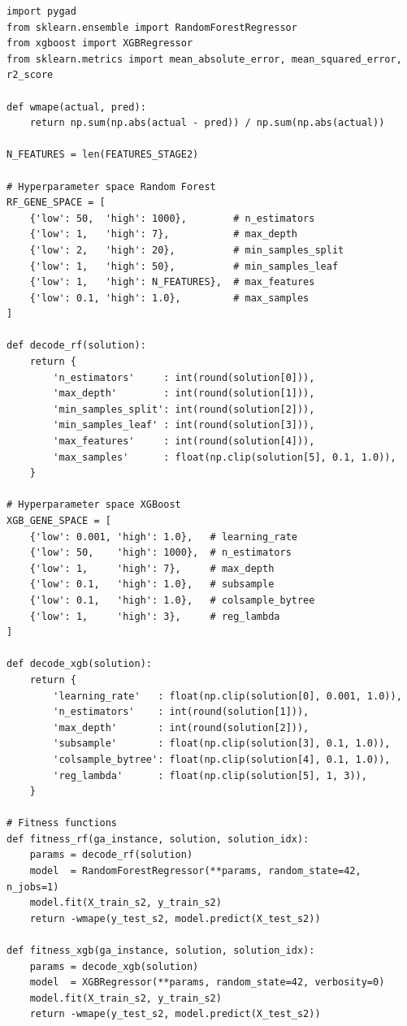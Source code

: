 \begin{lstlisting}[style=pycode,caption={Definisi hyperparameter space dan fungsi fitness GA}]
import pygad
from sklearn.ensemble import RandomForestRegressor
from xgboost import XGBRegressor
from sklearn.metrics import mean_absolute_error, mean_squared_error, r2_score

def wmape(actual, pred):
    return np.sum(np.abs(actual - pred)) / np.sum(np.abs(actual))

N_FEATURES = len(FEATURES_STAGE2)

# Hyperparameter space Random Forest
RF_GENE_SPACE = [
    {'low': 50,  'high': 1000},        # n_estimators
    {'low': 1,   'high': 7},           # max_depth
    {'low': 2,   'high': 20},          # min_samples_split
    {'low': 1,   'high': 50},          # min_samples_leaf
    {'low': 1,   'high': N_FEATURES},  # max_features
    {'low': 0.1, 'high': 1.0},         # max_samples
]

def decode_rf(solution):
    return {
        'n_estimators'     : int(round(solution[0])),
        'max_depth'        : int(round(solution[1])),
        'min_samples_split': int(round(solution[2])),
        'min_samples_leaf' : int(round(solution[3])),
        'max_features'     : int(round(solution[4])),
        'max_samples'      : float(np.clip(solution[5], 0.1, 1.0)),
    }

# Hyperparameter space XGBoost
XGB_GENE_SPACE = [
    {'low': 0.001, 'high': 1.0},   # learning_rate
    {'low': 50,    'high': 1000},  # n_estimators
    {'low': 1,     'high': 7},     # max_depth
    {'low': 0.1,   'high': 1.0},   # subsample
    {'low': 0.1,   'high': 1.0},   # colsample_bytree
    {'low': 1,     'high': 3},     # reg_lambda
]

def decode_xgb(solution):
    return {
        'learning_rate'   : float(np.clip(solution[0], 0.001, 1.0)),
        'n_estimators'    : int(round(solution[1])),
        'max_depth'       : int(round(solution[2])),
        'subsample'       : float(np.clip(solution[3], 0.1, 1.0)),
        'colsample_bytree': float(np.clip(solution[4], 0.1, 1.0)),
        'reg_lambda'      : float(np.clip(solution[5], 1, 3)),
    }

# Fitness functions
def fitness_rf(ga_instance, solution, solution_idx):
    params = decode_rf(solution)
    model  = RandomForestRegressor(**params, random_state=42, n_jobs=1)
    model.fit(X_train_s2, y_train_s2)
    return -wmape(y_test_s2, model.predict(X_test_s2))

def fitness_xgb(ga_instance, solution, solution_idx):
    params = decode_xgb(solution)
    model  = XGBRegressor(**params, random_state=42, verbosity=0)
    model.fit(X_train_s2, y_train_s2)
    return -wmape(y_test_s2, model.predict(X_test_s2))
\end{lstlisting}

